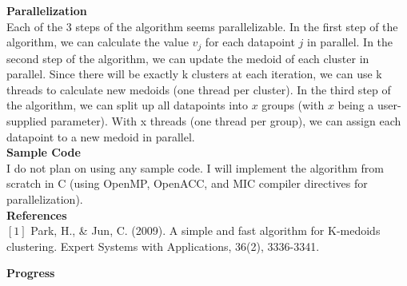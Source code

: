 \documentclass{article}
\begin{document}
\textbf{Parallelization} \\
Each of the 3 steps of the algorithm seems parallelizable. 
In the first step of the algorithm, we can calculate the value $v_j$ for each datapoint $j$ in parallel. 
In the second step of the algorithm, we can update the medoid of each cluster in parallel. 
Since there will be exactly k clusters at each iteration, we can use k threads to calculate new medoids (one thread per cluster). 
In the third step of the algorithm, we can split up all datapoints into $x$ groups (with $x$ being a user-supplied parameter). 
With x threads (one thread per group), we can assign each datapoint to a new medoid in parallel. \\

\textbf{Sample Code} \\
I do not plan on using any sample code. I will implement the algorithm from scratch in C (using OpenMP, OpenACC, and MIC compiler directives for parallelization).\\

\textbf{References} \\ 
$[1]$ Park, H., \& Jun, C. (2009). A simple and fast algorithm for K-medoids clustering. Expert Systems with Applications, 36(2), 3336-3341.

\newpage

\begin{center}
\textbf{Progress} \\~\\
\end{center}
\end{document}
